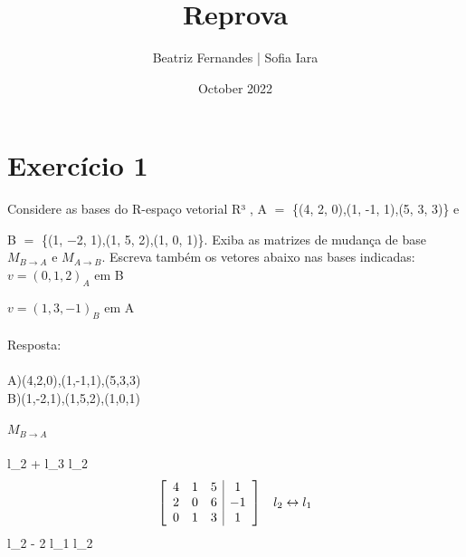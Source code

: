 \documentclass[12pt,a4]{article}
\title{Reprova}
\author{Beatriz Fernandes | Sofia Iara }
\date{October 2022}
\begin{document}
\maketitle

\section*{Exercício 1}
 Considere as bases do R-espaço vetorial R³
, A $=$ \{(4, 2, 0),(1, -1, 1),(5, 3, 3)\} e

B $=$ \{(1, −2, 1),(1, 5, 2),(1, 0, 1)\}. Exiba as matrizes de mudança de base $M_{B \rightarrow A}$ e $ M_{A \rightarrow B}$. Escreva também os
vetores abaixo nas bases indicadas:\\
 

\bullet $v = (0, 1, 2)_{A}$ em B

\bullet $v = (1, 3, −1)_{B}$ em A\\ \\
Resposta:\\ \\
A){(4,2,0),(1,-1,1),(5,3,3)}\\
B){(1,-2,1),(1,5,2),(1,0,1)}\\ \\
\bullet $M_{B \rightarrow A}$\\ \\
 \hspace{0.3cm}l_{2} + l_{3} \rightarrow l_{2}
\left
\begin{equation*}
\left[\begin{array}{ccc|c}
4 & 1 & 5 & 1 \\
2 & 0 & 6 & -1\\
0 & 1 & 3 & 1\\
\end{array}\right] \hspace{0.3cm} l_{2}\leftrightarrow l_{1}
\end{equation*}
 \hspace{0.3cm} l_{2} - 2 \cdot l_{1} \rightarrow l_{2}\newline\[\]
\end{document}
